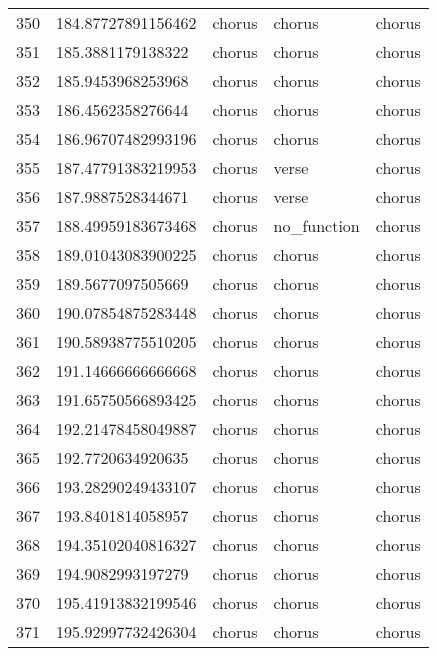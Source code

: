 \begin{table}[]
\begin{tabular}{lllll}
    350  & 184.87727891156462 & chorus       & chorus          & chorus         \\
    351  & 185.3881179138322  & chorus       & chorus          & chorus         \\
    352  & 185.9453968253968  & chorus       & chorus          & chorus         \\
    353  & 186.4562358276644  & chorus       & chorus          & chorus         \\
    354  & 186.96707482993196 & chorus       & chorus          & chorus         \\
    355  & 187.47791383219953 & chorus       & verse           & chorus         \\
    356  & 187.9887528344671  & chorus       & verse           & chorus         \\
    357  & 188.49959183673468 & chorus       & no\_function    & chorus         \\
    358  & 189.01043083900225 & chorus       & chorus          & chorus         \\
    359  & 189.5677097505669  & chorus       & chorus          & chorus         \\
    360  & 190.07854875283448 & chorus       & chorus          & chorus         \\
    361  & 190.58938775510205 & chorus       & chorus          & chorus         \\
    362  & 191.14666666666668 & chorus       & chorus          & chorus         \\
    363  & 191.65750566893425 & chorus       & chorus          & chorus         \\
    364  & 192.21478458049887 & chorus       & chorus          & chorus         \\
    365  & 192.7720634920635  & chorus       & chorus          & chorus         \\
    366  & 193.28290249433107 & chorus       & chorus          & chorus         \\
    367  & 193.8401814058957  & chorus       & chorus          & chorus         \\
    368  & 194.35102040816327 & chorus       & chorus          & chorus         \\
    369  & 194.9082993197279  & chorus       & chorus          & chorus         \\
    370  & 195.41913832199546 & chorus       & chorus          & chorus         \\
    371  & 195.92997732426304 & chorus       & chorus          & chorus         \\

\end{tabular}
\end{table}
